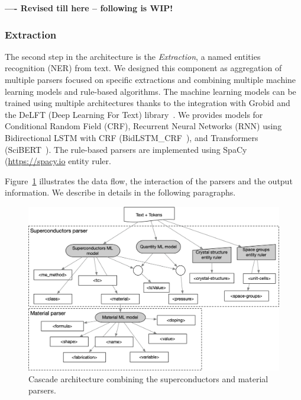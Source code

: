 \documentclass{article}
\begin{document}
\textbf{---- Revised till here -- following is WIP!}

\subsubsection{Extraction}

The second step in the architecture is the \textit{Extraction}, a named entities recognition (NER) from text. 
We designed this component as aggregation of multiple parsers focused on specific extractions and combining multiple machine learning models and rule-based algorithms.
The machine learning models can be trained using multiple architectures thanks to the integration with Grobid and the DeLFT (Deep Learning For Text) library~\cite{DeLFT}. 
We provides models for Conditional Random Field (CRF), Recurrent Neural Networks (RNN) using Bidirectional LSTM with CRF (BidLSTM\_CRF~\cite{Lample2016NeuralAF}), and Transformers (SciBERT~\cite{Beltagy2019SciBERT}).
The rule-based parsers are implemented using SpaCy (\url{https://spacy.io} entity ruler.

Figure~\ref{fig:extraction-ml-models-cascade-architecture} illustrates the data flow, the interaction of the parsers and the output information. We describe in details in the following paragraphs.  

\begin{figure}[ht]
\label{fig:extraction-ml-models-cascade-architecture}
\includegraphics[width=\textwidth]{extraction-schema-2}
\caption{Cascade architecture combining the superconductors and material parsers.}
\end{figure}
\end{document}
